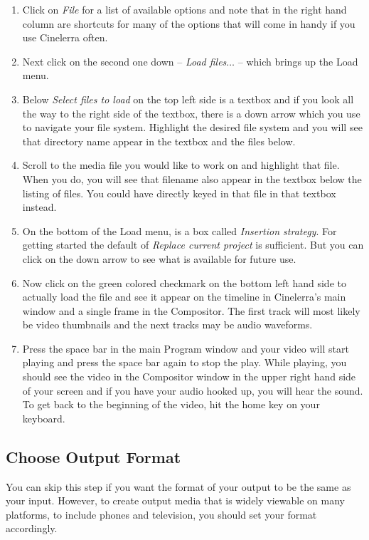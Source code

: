 \begin{enumerate}
	\item Click on \textit{File} for a list of available options and note that in the right hand column are shortcuts for
	many of the options that will come in handy if you use Cinelerra often.
	\item Next click on the second one down -- \textit{Load files$\dots$} -- which brings up the Load menu.
	\item Below \textit{Select files to load} on the top left side is a textbox and if you look all the way to the right
	side of the textbox, there is a down arrow which you use to navigate your file system.  Highlight the
	desired file system and you will see that directory name appear in the textbox and the files below.
	\item Scroll to the media file you would like to work on and highlight that file.  When you do, you will
	see that filename also appear in the textbox below the listing of files.  You could have directly
	keyed in that file in that textbox instead.
	\item On the bottom of the Load menu, is a box called \textit{Insertion strategy}.  For getting started the
	default of \textit{Replace current project} is sufficient.  But you can click on the down arrow to see what
	is available for future use.
	\item Now click on the green colored checkmark on the bottom left hand side to actually load the file
	and see it appear on the timeline in Cinelerra’s main window and a single frame in the Compositor.
	The first track will most likely be video thumbnails and the next tracks may be audio waveforms.
	\item Press the space bar in the main Program window and your video will start playing and press the
	space bar again to stop the play.  While playing, you should see the video in the Compositor
	window in the upper right hand side of your screen and if you have your audio hooked up, you
	will hear the sound.  To get back to the beginning of the video, hit the home key on your keyboard.
\end{enumerate}

\subsection{Choose Output Format}%
\label{sub:choose_output_format}
	
You can skip this step if you want the format of your output to be the same as your input.  However, to create output media that is widely viewable on many platforms, to include phones and television, you should set your format accordingly.

